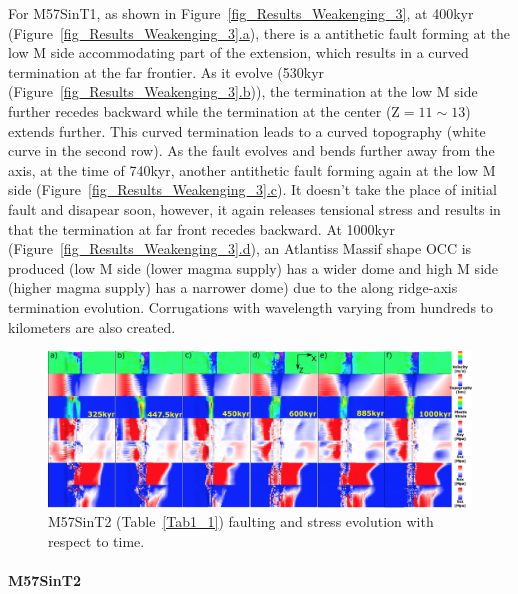 For M57SinT1, as shown in Figure~\hyperref[fig_Results_Weakenging_3]{\ref{fig_Results_Weakenging_3}}, at 400kyr (Figure~\hyperref[fig_Results_Weakenging_3]{\ref{fig_Results_Weakenging_3}.a}), there is a antithetic fault forming at the low M side accommodating part of the extension, which results in a curved termination at the far frontier. As it evolve (530kyr (Figure~\hyperref[fig_Results_Weakenging_3]{\ref{fig_Results_Weakenging_3}.b})), the termination at the low M side further recedes backward while the termination at the center (Z$=11\sim13$) extends further. This curved termination leads to a curved topography (white curve in the second row). As the fault evolves and bends further away from the axis, at the time of 740kyr, another antithetic fault forming again at the low M side (Figure~\hyperref[fig_Results_Weakenging_3]{\ref{fig_Results_Weakenging_3}.c}). It doesn't take the place of initial fault and disapear soon, however, it again releases tensional stress and results in that the termination at far front recedes backward. At 1000kyr (Figure~\hyperref[fig_Results_Weakenging_3]{\ref{fig_Results_Weakenging_3}.d}), an Atlantiss Massif shape OCC is produced (low M side (lower magma supply) has a wider dome and high M side (higher magma supply) has a narrower dome) due to the along ridge-axis termination evolution. Corrugations with wavelength varying from hundreds to kilometers are also created.       

\begin{figure}[h]
 \centering
  \includegraphics[width=1.0\textwidth]{fig_Results_Weakening_4_M57SinT2_time_evolution.eps}
 \caption{M57SinT2 (Table~\hyperref[Tab1_1]{\ref{Tab1_1}}) faulting and stress evolution with respect to time.}
\label{fig_Results_Weakenging_4}
\end{figure}

\paragraph{M57SinT2}\label{para_M57SinT2}

